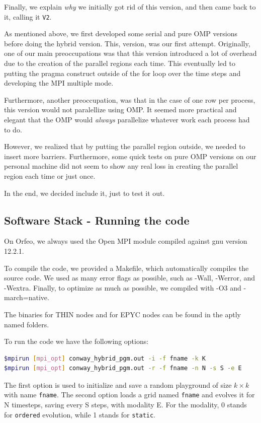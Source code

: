 \documentclass{report}
\begin{document}
Finally, we explain \textit{why} we initially got rid of this version, and then 
came back to it, calling it \texttt{V2}.

As mentioned above, we first developed some serial and pure OMP versions before 
doing the hybrid version. This, version, was our first attempt. Originally, 
one of our main preoccupations was that this version introduced a lot of 
overhead due to the creation of the parallel regions each time.
This eventually led to putting the pragma construct outside of the 
for loop over the time steps and developing the MPI multiple mode. 

Furthermore, another preoccupation, was that in the case of one row per process, 
this version would not paralellize using OMP. It seemed more practical and 
elegant that the OMP would \textit{always} parallelize whatever work each 
process had to do. 

However, we realized that by putting the parallel region outside, we needed to 
insert more barriers. Furthermore, some quick tests on pure OMP versions on our 
personal machine did not seem to show any real loss in creating the parallel region 
each time or just once.

In the end, we decided include it, just to test it out.

\subsection{Software Stack - Running the code}
On Orfeo, we always used the Open MPI module compiled against gnu version 12.2.1. 

To compile the code, we provided a Makefile, which automatically compiles the 
source code. We used as many error flags as possible, such as -Wall, -Werror, and 
-Wextra. Finally, to optimize as much as possible, we compiled with -O3 and 
-march=native. 

The binaries for THIN nodes and for EPYC nodes can be found in the aptly named  
folders.

To run the code we have the following options:

\begin{lstlisting}[language=bash]
$mpirun [mpi_opt] conway_hybrid_pgm.out -i -f fname -k K 
$mpirun [mpi_opt] conway_hybrid_pgm.out -r -f fname -n N -s S -e E
\end{lstlisting}
The first option is used to initialize and save a random playground of size 
$k \times k$ with name \texttt{fname}.
The second option loads a grid named \texttt{fname} and evolves it for N 
timesteps, saving every S steps, with modality E. For the modality, 0 stands 
for \texttt{ordered} evolution, while 1 stands for \texttt{static}.
\end{document}
